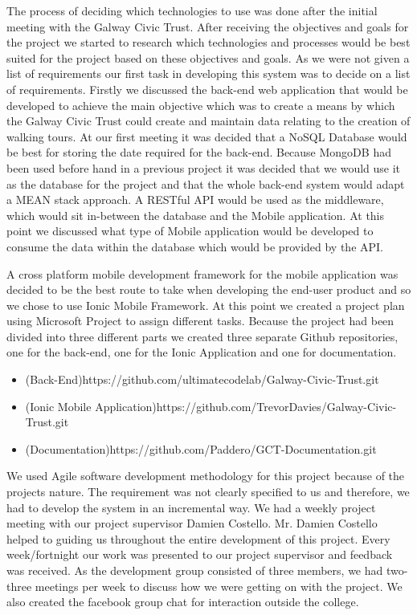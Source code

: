 The process of deciding which technologies to use was done after the initial meeting with the Galway Civic Trust. After receiving the objectives and goals for the project we started to research which technologies and processes would be best suited for the project based on these objectives and goals. As we were not given a list of requirements our first task in developing this system was to decide on a list of requirements. Firstly we discussed the back-end web application that would be developed to achieve the main objective which was to create a means by which the Galway Civic Trust could create and maintain data relating to the creation of walking tours. At our first meeting it was decided that a NoSQL Database would be best for storing the date required for the back-end. Because MongoDB had been used before hand in a previous project it was decided that we would use it as the database for the project and that the whole back-end system would adapt a MEAN stack approach. A RESTful API would be used as the middleware, which would sit in-between the database and the Mobile application.  At this point we discussed what type of Mobile application would be developed to consume the data within the database which would be provided by the API.

A cross platform mobile development framework for the mobile application was decided to be the best route to take when developing the end-user product and so we chose to use Ionic Mobile Framework. At this point we created a project plan using Microsoft Project to assign different tasks. Because the project had been divided into three different parts we created three separate Github repositories, one for the back-end, one for the Ionic Application and one for documentation. 
\begin{itemize}
	\item{(Back-End)https://github.com/ultimatecodelab/Galway-Civic-Trust.git}
	\item{(Ionic Mobile Application)https://github.com/TrevorDavies/Galway-Civic-Trust.git}
	\item{(Documentation)https://github.com/Paddero/GCT-Documentation.git}
\end{itemize}

We used Agile software development methodology for this project because of the projects nature. The requirement was not clearly specified to us and therefore, we had to develop the system in an incremental way. We had a weekly project meeting with our project supervisor Damien Costello. Mr. Damien Costello helped to guiding us throughout the entire development of this project. Every week/fortnight  our work was presented to our project supervisor and feedback was received.  As the development group consisted of three members, we had two-three meetings per week to discuss how we were getting on with  the project. We also created the facebook group chat for interaction outside the college. 


